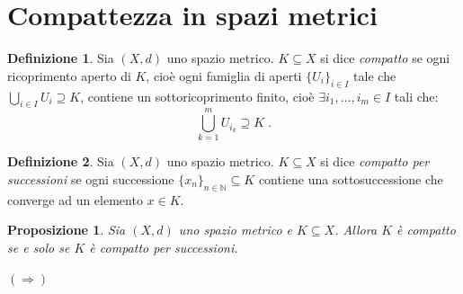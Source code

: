 \documentclass[a4paper,12pt]{report}
\theoremstyle{plain}
\newtheorem{prop}{Proposizione}[section]
\theoremstyle{definition}
\newtheorem{defn}{Definizione}[section]
\theoremstyle{remark}
\numberwithin{equation}{section}
\begin{document}
\section{Compattezza in spazi metrici}
\begin{defn} Sia $(X,d)$ uno spazio metrico. $K \subseteq X$ si dice \textit{compatto} se ogni ricoprimento aperto di $K$, cioè ogni famiglia di aperti $\{U_i\}_{i\in I}$ tale che $\bigcup_{i \in I} U_i \supseteq K$, contiene un sottoricoprimento finito, cioè $\exists i_1,\ldots,
i_m \in I$ tali che:
\begin{equation}
\bigcup_{k=1}^m U_{i_k} \supseteq K\;.
\end{equation}
\end{defn}
\begin{defn} Sia $(X,d)$ uno spazio metrico. $K \subseteq X$ si dice \textit{compatto per successioni} se ogni successione $\{x_n\}_{n \in \mathbb{N}}\subseteq K$ contiene una sottosuccessione che converge ad un elemento $x \in K$.
\end{defn}
\begin{prop} Sia $(X,d)$ uno spazio metrico e $K \subseteq X$. Allora $K$ è compatto se e solo se $K$ è compatto per successioni.
\end{prop}
\proof $(\Longrightarrow)$ \\
\end{document}
